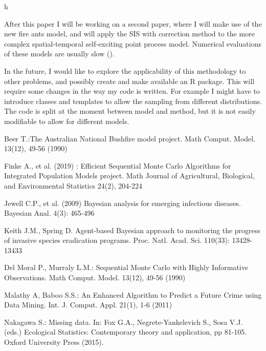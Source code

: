 h\documentclass[11pt,a4paper]{article}
\begin{document}
After this paper I will be working on a second paper, where I will make use of the new fire ants model, and will apply the SIS with correction method to the more complex spatial-temporal self-exciting point process model. Numerical evaluations of these models are usually slow (\cite{Reinhart}).

In the future, I would like to explore the applicability of this methodology to other problems, and possibly create and make available an R package. This will require some changes in the way my code is written. For example I might have to introduce classes and templates to allow the sampling from different distributions. The code is split at the moment between model and method, but it is not easily modifiable to allow for different models.


\begin{thebibliography}{99}

Beer T.:The Australian National Bushfire model project. Math Comput. Model. 13(12), 49-56 (1990)

Finke A., et al. (2019) : Efficient Sequential Monte Carlo Algorithms for Integrated Population Models project. Math Journal of Agricultural, Biological, and Environmental Statistics 24(2), 204-224

 Jewell C.P., et al. (2009) Bayesian analysis for emerging infectious diseases. Bayesian Anal. 4(3): 465-496

 Keith J.M., Spring D. Agent-based Bayesian approach to monitoring the progress of invasive species eradication programs. Proc. Natl. Acad. Sci. 110(33): 13428-13433

Del Moral P., Murraly L.M.: Sequential Monte Carlo with Highly Informative Observations. Math Comput. Model. 13(12), 49-56 (1990)

Malathy A, Baboo S.S.: An Enhanced Algorithm to Predict a Future Crime using Data Mining. Int. J. Comput. Appl. 21(1), 1-6 (2011)

Nakagawa S.: Missing data. In: Fox G.A., Negrete-Yankelevich S., Sosa V.J. (eds.) Ecological Statistics: Contemporary theory and application, pp 81-105. Oxford University Press (2015). 


\end{thebibliography}
\end{document}
